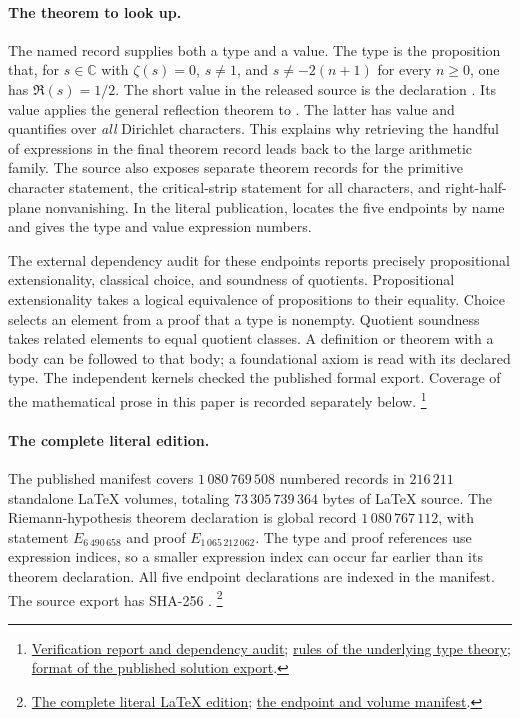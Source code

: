 \paragraph{The theorem to look up.}
The named record  supplies both a type and a
value. The type is the proposition that, for \(s\in\mathbb C\) with
\(\zeta(s)=0\), \(s\ne1\), and \(s\ne-2(n+1)\) for every \(n\ge0\),
one has \(\Re(s)=1/2\). The short value in the released source is the
declaration . Its value applies the general reflection
theorem  to .
The latter has value 
and quantifies over \emph{all} Dirichlet characters. This explains why
retrieving the handful of expressions in the final theorem record
leads back to the large arithmetic family. The source also exposes
separate theorem records for the primitive character statement, the
critical-strip statement for all characters, and right-half-plane
nonvanishing. In the literal publication, 
locates the five endpoints by name and gives the type and value
expression numbers.

The external dependency audit for these endpoints reports precisely
propositional extensionality, classical choice, and soundness of
quotients. Propositional extensionality takes a logical equivalence of
propositions to their equality. Choice selects an element from a proof
that a type is nonempty. Quotient soundness takes related elements to
equal quotient classes. A definition or theorem with a body can be
followed to that body; a foundational axiom is read with its declared
type. The independent kernels checked the published formal export.
Coverage of the mathematical prose in this paper is recorded separately
below.
\footnote{\href{https://math.mit.edu/~drew/grh/}{Verification report
and dependency audit};
\href{https://lean-lang.org/doc/reference/latest/The-Type-System/}{rules
of the underlying type theory};
\href{https://github.com/leanprover/lean4export/blob/v4.33.0/format_ndjson.md}{format
of the published solution export}.}

\paragraph{The complete literal edition.}
The published manifest covers \(1\,080\,769\,508\) numbered records
in \(216\,211\) standalone LaTeX volumes, totaling
\(73\,305\,739\,364\) bytes of LaTeX source.
The Riemann-hypothesis theorem declaration is global record
\(1\,080\,767\,112\), with statement \(E_{6\,490\,658}\)
and proof \(E_{1\,065\,212\,062}\).
The type and proof references use expression indices, so a smaller
expression index can occur far earlier than its theorem declaration.
All five endpoint declarations are indexed in the manifest.
The source export has SHA-256
.
\footnote{\href{https://github.com/ChristianKudeba/alpoge-rh-verification/releases/tag/rh-literal-kernel-v1}{The complete literal LaTeX edition};
\href{https://github.com/ChristianKudeba/alpoge-rh-verification/releases/download/rh-literal-kernel-v1/edition-index.json}{the endpoint and volume manifest}.}
